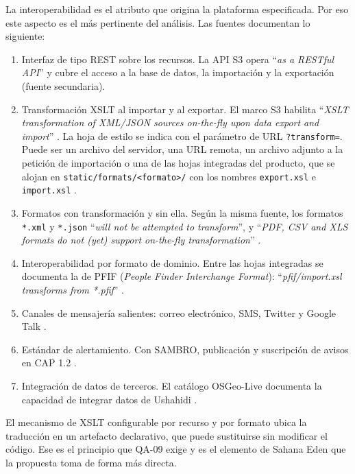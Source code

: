 \documentclass[11pt,letterpaper]{article}
\begin{document}
La interoperabilidad es el atributo que origina la plataforma especificada. Por eso este aspecto es
el más pertinente del análisis. Las fuentes documentan lo siguiente:

\begin{enumerate}
  \item Interfaz de tipo REST sobre los recursos. La API S3 opera \enquote{\emph{as a RESTful API}}
        y cubre el acceso a la base de datos, la importación y la exportación \cite{desosa2018}
        (fuente secundaria).
  \item Transformación XSLT al importar y al exportar. El marco S3 habilita \enquote{\emph{XSLT
        transformation of XML/JSON sources on-the-fly upon data export and import}}
        \cite{eden-xslt}. La hoja de estilo se indica con el parámetro de URL \texttt{?transform=}.
        Puede ser un archivo del servidor, una URL remota, un archivo adjunto a la petición de
        importación o una de las hojas integradas del producto, que se alojan en
        \texttt{static/formats/<formato>/} con los nombres \texttt{export.xsl} e
        \texttt{import.xsl} \cite{eden-xslt}.
  \item Formatos con transformación y sin ella. Según la misma fuente, los formatos \texttt{*.xml} y
        \texttt{*.json} \enquote{\emph{will not be attempted to transform}}, y \enquote{\emph{PDF,
        CSV and XLS formats do not (yet) support on-the-fly transformation}} \cite{eden-xslt}.
  \item Interoperabilidad por formato de dominio. Entre las hojas integradas se documenta la de
        PFIF (\emph{People Finder Interchange Format}): \enquote{\emph{pfif/import.xsl transforms
        from *.pfif}} \cite{eden-xslt}.
  \item Canales de mensajería salientes: correo electrónico, SMS, Twitter y Google Talk
        \cite{sahana-eden-legacy}.
  \item Estándar de alertamiento. Con SAMBRO, publicación y suscripción de avisos en CAP 1.2
        \cite{sambro}.
  \item Integración de datos de terceros. El catálogo OSGeo-Live documenta la capacidad de integrar
        datos de Ushahidi \cite{osgeo}.
\end{enumerate}

El mecanismo de XSLT configurable por recurso y por formato ubica la traducción en un artefacto
declarativo, que puede sustituirse sin modificar el código. Ese es el principio que QA-09 exige y
es el elemento de Sahana Eden que la propuesta toma de forma más directa.
\end{document}
